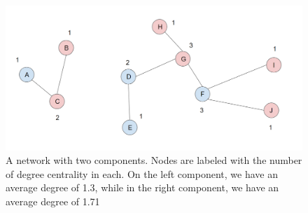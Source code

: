    \begin{figure}[h!]
        \centering
            \includegraphics[width=0.7\linewidth]{figures/Networks/Concepts/edgesConnectivity.png} 
        \caption{A network with two components. Nodes are labeled with the number of degree centrality in each. On the left component, we have an average degree of 1.3, while in the right component, we have an average degree of 1.71}
        \label{figure:networksConnectivity}
    \end{figure}   

